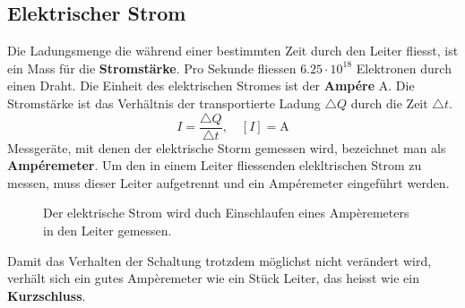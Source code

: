 \subsection{Elektrischer Strom}
Die Ladungsmenge die während einer bestimmten Zeit durch den Leiter fliesst, ist ein Mass für die \textbf{Stromstärke}. Pro Sekunde fliessen $6.25\cdot 10^{18}$ Elektronen durch einen Draht. Die Einheit des elektrischen Stromes ist der \textbf{Ampére} $\text{A}$. Die Stromstärke ist das Verhältnis der transportierte Ladung $\triangle Q$ durch die Zeit $\triangle t$.
\begin{equation} 
\boxed{I=\dfrac{\triangle Q}{\triangle t},\quad [I]=\text{A}}
\end{equation} 
Messgeräte, mit denen der elektrische Storm gemessen wird, bezeichnet man als \textbf{Ampéremeter}. Um den in einem Leiter fliessenden elekltrischen Strom zu messen, muss dieser Leiter aufgetrennt und ein Ampéremeter eingeführt werden. 
\begin{figure}[H]
\centering
{}
\caption{Der elektrische Strom wird duch Einschlaufen eines Ampèremeters in den Leiter gemessen.}
\end{figure}
Damit das Verhalten der Schaltung trotzdem möglichst nicht verändert wird, verhält sich ein gutes Ampèremeter wie ein Stück Leiter, das heisst wie ein \textbf{Kurzschluss}. 
